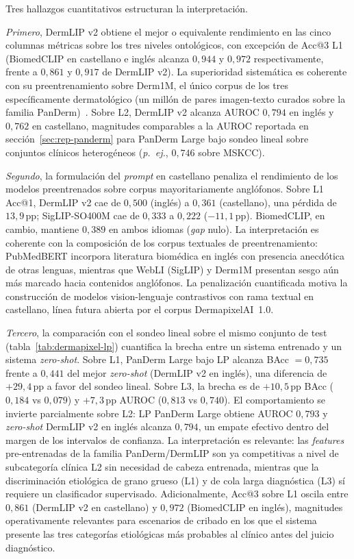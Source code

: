 Tres hallazgos cuantitativos estructuran la interpretación.

\textit{Primero}, DermLIP v2 obtiene el mejor o equivalente
rendimiento en las cinco columnas métricas sobre los tres niveles
ontológicos, con excepción de Acc@3 L1 (BiomedCLIP en castellano
e inglés alcanza $0{,}944$ y $0{,}972$ respectivamente, frente a
$0{,}861$ y $0{,}917$ de DermLIP v2). La superioridad
sistemática es coherente con su preentrenamiento sobre Derm1M, el
único corpus de los tres específicamente dermatológico (un millón
de pares imagen-texto curados sobre la familia
PanDerm)~\cite{derm1m}. Sobre L2, DermLIP v2 alcanza AUROC
$0{,}794$ en inglés y $0{,}762$ en castellano, magnitudes
comparables a la AUROC reportada en
secci\'on~\ref{sec:rep-panderm} para PanDerm Large bajo sondeo
lineal sobre conjuntos clínicos heterogéneos (\textit{p.~ej.},
$0{,}746$ sobre MSKCC).

\textit{Segundo}, la formulación del \emph{prompt} en castellano
penaliza el rendimiento de los modelos preentrenados sobre corpus
mayoritariamente anglófonos. Sobre L1 Acc@1, DermLIP v2 cae de
$0{,}500$ (inglés) a $0{,}361$ (castellano), una pérdida de
$13{,}9$\,pp; SigLIP-SO400M cae de $0{,}333$ a $0{,}222$
($-11{,}1$\,pp). BiomedCLIP, en cambio, mantiene
$0{,}389$ en ambos idiomas (\emph{gap} nulo). La interpretación
es coherente con la composición de los corpus textuales de
preentrenamiento: PubMedBERT incorpora literatura biomédica en
inglés con presencia anecdótica de otras lenguas, mientras que
WebLI (SigLIP) y Derm1M presentan sesgo aún más marcado hacia
contenidos anglófonos. La penalización cuantificada motiva la
construcción de modelos vision-lenguaje contrastivos con rama
textual en castellano, línea futura abierta por el corpus
DermapixelAI~1.0.

\textit{Tercero}, la comparación con el sondeo lineal sobre el
mismo conjunto de test (tabla~\ref{tab:dermapixel-lp}) cuantifica
la brecha entre un sistema entrenado y un sistema
\emph{zero-shot}. Sobre L1, PanDerm Large bajo LP alcanza
BAcc $= 0{,}735$ frente a $0{,}441$ del mejor \emph{zero-shot}
(DermLIP v2 en inglés), una diferencia de $+29{,}4$\,pp a favor
del sondeo lineal. Sobre L3, la brecha es de $+10{,}5$\,pp BAcc
($0{,}184$ vs $0{,}079$) y $+7{,}3$\,pp AUROC ($0{,}813$ vs
$0{,}740$). El comportamiento se invierte parcialmente sobre L2:
LP PanDerm Large obtiene AUROC $0{,}793$ y \emph{zero-shot}
DermLIP v2 en inglés alcanza $0{,}794$, un empate efectivo dentro
del margen de los intervalos de confianza. La interpretación es
relevante: las \emph{features} pre-entrenadas de la familia
PanDerm/DermLIP son ya competitivas a nivel de subcategoría
clínica L2 sin necesidad de cabeza entrenada, mientras que la
discriminación etiológica de grano grueso (L1) y de cola larga
diagnóstica (L3) sí requiere un clasificador supervisado.
Adicionalmente, Acc@3 sobre L1 oscila entre $0{,}861$ (DermLIP v2
en castellano) y $0{,}972$ (BiomedCLIP en inglés), magnitudes
operativamente relevantes para escenarios de cribado en los que
el sistema presente las tres categorías etiológicas más probables
al clínico antes del juicio diagnóstico.

